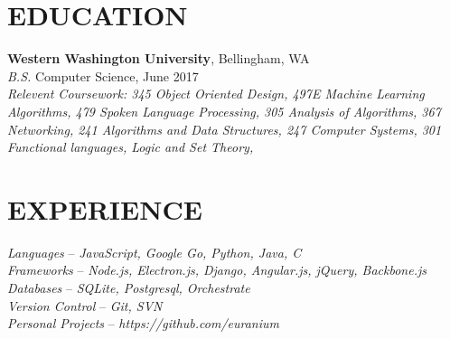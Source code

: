 \documentclass[line,margin]{res}
\begin{document}
\address{360.931.3237 $|$ rainierharvey@gmail.com $|$ http://nulldev.ninja $|$ github.com/euranium}

\begin{resume}

\section{EDUCATION}
	{\bf Western Washington University}, Bellingham, WA \\
	{\sl B.S.} Computer Science, {\small June 2017} \\
	{\sl Relevent Coursework: 345 {\small Object Oriented Design}, 497E {\small Machine Learning Algorithms}, 479 {\small Spoken Language Processing},
		305 {\small Analysis of Algorithms}, 367 {\small Networking},
		241 {\small Algorithms and Data Structures}, 247 {\small Computer Systems},
		301 {\small Functional languages, Logic and Set Theory}, }
\section{EXPERIENCE}

	{\sl Languages} -- {\sl JavaScript, Google Go, Python, Java, C}\\
	{\sl Frameworks} -- {\sl Node.js, Electron.js, Django, Angular.js, jQuery, Backbone.js} \\
	{\sl Databases} -- {\sl SQLite, Postgresql, Orchestrate} \\
	{\sl Version Control} -- {\sl Git, SVN}\\
	{\sl Personal Projects} -- {\sl https://github.com/euranium}\\


\end{resume}
\end{document}
